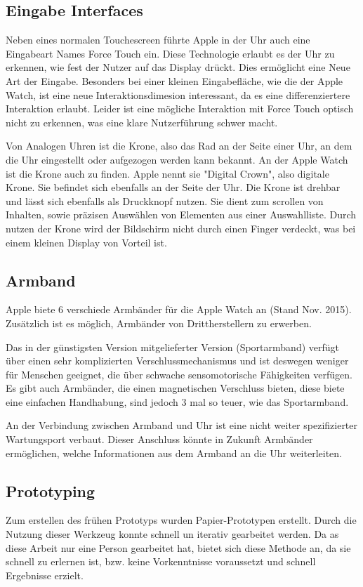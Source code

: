 \subsection{Eingabe Interfaces}
\label{ch:eingabe_interface}
Neben eines normalen Touchescreen führte Apple in der Uhr auch eine Eingabeart Names Force Touch ein. Diese Technologie erlaubt es der Uhr zu erkennen, wie fest der Nutzer auf das Display drückt. Dies ermöglicht eine Neue Art der Eingabe. Besonders bei einer kleinen Eingabefläche, wie die der Apple Watch, ist eine neue Interaktionsdimesion interessant, da es eine differenziertere Interaktion erlaubt. Leider ist eine mögliche Interaktion mit Force Touch optisch nicht zu erkennen, was eine klare Nutzerführung schwer macht.

 Von Analogen Uhren ist die Krone, also das Rad an der Seite einer Uhr, an dem die Uhr eingestellt oder aufgezogen werden kann bekannt. An der Apple Watch ist die Krone auch zu finden. Apple nennt sie "Digital Crown", also digitale Krone. Sie befindet sich ebenfalls an der Seite der Uhr. Die Krone ist drehbar und lässt sich ebenfalls als Druckknopf nutzen. Sie dient zum scrollen von Inhalten, sowie präzisen Auswählen von Elementen aus einer Auswahlliste. Durch nutzen der Krone wird der Bildschirm nicht durch einen Finger verdeckt, was bei einem kleinen Display von Vorteil ist.

\subsection{Armband}
Apple biete 6 verschiede Armbänder für die Apple Watch an (Stand Nov. 2015). Zusätzlich ist es möglich, Armbänder von Drittherstellern zu erwerben. 

Das in der günstigsten Version mitgelieferter Version (Sportarmband) verfügt über einen sehr komplizierten Verschlussmechanismus und ist deswegen weniger für Menschen geeignet, die über schwache sensomotorische Fähigkeiten verfügen. Es gibt auch Armbänder, die einen magnetischen Verschluss bieten, diese biete eine einfachen Handhabung, sind jedoch 3 mal so teuer, wie das Sportarmband.

An der Verbindung zwischen Armband und Uhr ist eine nicht weiter spezifizierter Wartungsport verbaut. Dieser Anschluss könnte in Zukunft Armbänder ermöglichen, welche Informationen aus dem Armband an die Uhr weiterleiten.
\subsection{Prototyping}
Zum erstellen des frühen Prototyps wurden Papier-Prototypen erstellt. Durch die Nutzung dieser Werkzeug konnte schnell un iterativ gearbeitet werden. Da as diese Arbeit nur eine Person gearbeitet hat, bietet sich diese Methode an, da sie schnell zu erlernen ist, bzw. keine Vorkenntnisse voraussetzt und schnell Ergebnisse erzielt.
